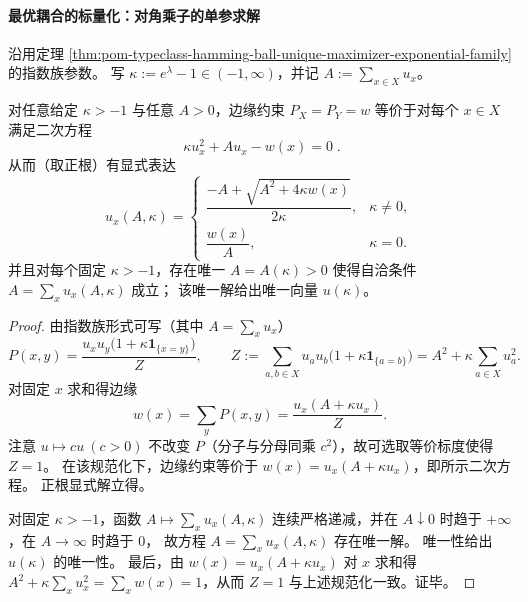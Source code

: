 \paragraph{最优耦合的标量化：对角乘子的单参求解}
沿用定理 \ref{thm:pom-typeclass-hamming-ball-unique-maximizer-exponential-family} 的指数族参数。
写 \(\kappa:=e^{\lambda}-1\in(-1,\infty)\)，并记 \(A:=\sum_{x\in X}u_x\)。

\begin{theorem}[边缘约束的二次根与自洽方程]\label{thm:pom-typeclass-diagonal-coupling-scalarization}
对任意给定 \(\kappa>-1\) 与任意 \(A>0\)，边缘约束 \(P_X=P_Y=w\) 等价于对每个 \(x\in X\) 满足二次方程
\[
\boxed{\;
\kappa u_x^2+A u_x-w(x)=0\; } .
\]
从而（取正根）有显式表达
\[
u_x(A,\kappa)=
\begin{cases}
\dfrac{-A+\sqrt{A^2+4\kappa w(x)}}{2\kappa}, & \kappa\ne0,\\[10pt]
\dfrac{w(x)}{A}, & \kappa=0.
\end{cases}
\]
并且对每个固定 \(\kappa>-1\)，存在唯一 \(A=A(\kappa)>0\) 使得自洽条件 \(A=\sum_x u_x(A,\kappa)\) 成立；
该唯一解给出唯一向量 \(u(\kappa)\)。
\end{theorem}
\begin{proof}
由指数族形式可写（其中 \(A=\sum_x u_x\)）
\[
P(x,y)=\frac{u_xu_y\bigl(1+\kappa\mathbf 1_{\{x=y\}}\bigr)}{Z},
\qquad
Z:=\sum_{a,b\in X}u_au_b\bigl(1+\kappa\mathbf 1_{\{a=b\}}\bigr)=A^2+\kappa\sum_{a\in X}u_a^2.
\]
对固定 \(x\) 求和得边缘
\[
w(x)=\sum_y P(x,y)=\frac{u_x(A+\kappa u_x)}{Z}.
\]
注意 \(u\mapsto cu\ (c>0)\) 不改变 \(P\)（分子与分母同乘 \(c^2\)），故可选取等价标度使得 \(Z=1\)。
在该规范化下，边缘约束等价于 \(w(x)=u_x(A+\kappa u_x)\)，即所示二次方程。
正根显式解立得。
\par
对固定 \(\kappa>-1\)，函数 \(A\mapsto \sum_x u_x(A,\kappa)\) 连续严格递减，并在 \(A\downarrow 0\) 时趋于 \(+\infty\)，在 \(A\to\infty\) 时趋于 \(0\)，
故方程 \(A=\sum_x u_x(A,\kappa)\) 存在唯一解。
唯一性给出 \(u(\kappa)\) 的唯一性。
最后，由 \(w(x)=u_x(A+\kappa u_x)\) 对 \(x\) 求和得 \(A^2+\kappa\sum_x u_x^2=\sum_x w(x)=1\)，从而 \(Z=1\) 与上述规范化一致。证毕。
\end{proof}

